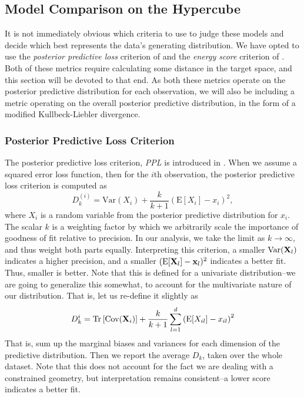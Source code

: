 \subsection{Model Comparison on the Hypercube}
It is not immediately obvious which criteria to use to judge these models and decide which best
  represents the data's generating distribution.  We have opted to use the
  \emph{posterior predictive loss} criterion of \cite{gelfand1998} and the
  \emph{energy score} criterion of \cite{gneiting2007}.  Both of these
  metrics require calculating some distance in the target space, and this section will be devoted
  to that end.  As both these metrics operate on the posterior predictive distribution for each
  observation, we will also be including a metric operating on the overall posterior predictive
  distribution, in the form of a modified Kullbeck-Liebler divergence.

\subsubsection{Posterior Predictive Loss Criterion}
The posterior predictive loss criterion, \emph{PPL} is introduced in \cite{gelfand1998}.  When we
  assume a squared error loss function, then for the $i$th observation, the posterior predictive
  loss criterion is computed as
  \begin{equation}
    \label{eq:ppl}
    D_{k}^{(i)} = \text{Var}(X_i) + \frac{k}{k + 1}\left(\text{E}[X_i] - x_i\right)^2,
  \end{equation}
  where $X_i$ is a random variable from the posterior predictive distribution for $x_i$.  The
  scalar $k$ is a weighting factor by which we arbitrarily scale the importance of goodness of fit
  relative to precision.  In our analysis, we take the limit as $k\to\infty$, and thus weight both
  parts equally.  Interpreting this criterion, a smaller $\text{Var}({\bf X}_l)$ indicates a higher
  precision, and a smaller $(\text{E}[{\bf X}_l] - {\bf x}_l)^2$  indicates a better fit.  Thus,
  smaller is better.  Note that this is defined for a univariate distribution--we are going to
  generalize this somewhat, to account for the multivariate nature of our distribution.  That is,
  let us re-define it slightly as
  \begin{equation}
    \label{eq:ppl2}
    D_k^{i} = \operatorname{Tr}\left[\text{Cov}({\bf X}_i)\right] +
        \frac{k}{k+1}\sum_{l=1}^d\left(\text{E}[X_{il}] - x_{il}\right)^2
  \end{equation}
  That is, sum up the marginal biases and variances for each dimension of the predictive distribution.
  Then we report the average $D_k$, taken over the whole dataset. Note that this does not account
  for the fact we are dealing with a constrained geometry, but interpretation remains consistent--a
  lower score indicates a better fit.

